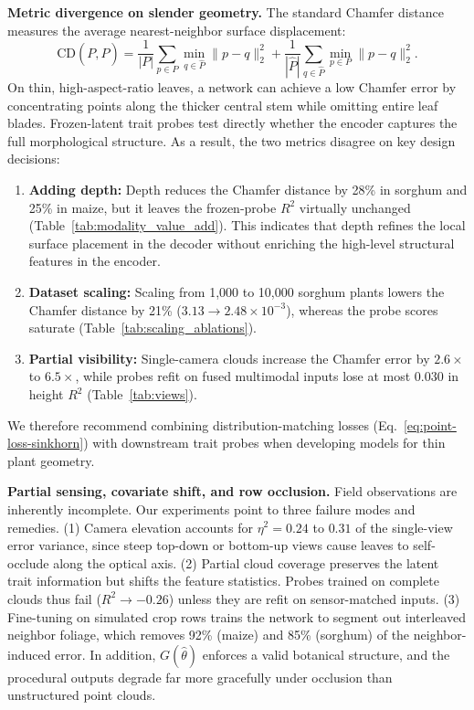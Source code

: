 \documentclass[10pt,twocolumn,letterpaper]{article}
\begin{document}
\noindent\textbf{Metric divergence on slender geometry.}
The standard Chamfer distance measures the average nearest-neighbor surface displacement:
\begin{equation}
  \mathrm{CD}(P, \hat P) = \frac{1}{|P|}\sum_{p\in P}\min_{q\in\hat P}\|p-q\|_2^2 + \frac{1}{|\hat P|}\sum_{q\in\hat P}\min_{p\in P}\|p-q\|_2^2.
  \label{eq:chamfer_def}
\end{equation}
On thin, high-aspect-ratio leaves, a network can achieve a low Chamfer error by concentrating points along the thicker central stem while omitting entire leaf blades. Frozen-latent trait probes test directly whether the encoder captures the full morphological structure. As a result, the two metrics disagree on key design decisions:
\begin{enumerate}
  \item \textbf{Adding depth:} Depth reduces the Chamfer distance by 28\% in sorghum and 25\% in maize, but it leaves the frozen-probe $R^2$ virtually unchanged (Table~\ref{tab:modality_value_add}). This indicates that depth refines the local surface placement in the decoder without enriching the high-level structural features in the encoder.
  \item \textbf{Dataset scaling:} Scaling from 1{,}000 to 10{,}000 sorghum plants lowers the Chamfer distance by 21\% ($3.13 \to 2.48 \times 10^{-3}$), whereas the probe scores saturate (Table~\ref{tab:scaling_ablations}).
  \item \textbf{Partial visibility:} Single-camera clouds increase the Chamfer error by $2.6\times$ to $6.5\times$, while probes refit on fused multimodal inputs lose at most 0.030 in height $R^2$ (Table~\ref{tab:views}).
\end{enumerate}
We therefore recommend combining distribution-matching losses (Eq.~\ref{eq:point-loss-sinkhorn}) with downstream trait probes when developing models for thin plant geometry.

\noindent\textbf{Partial sensing, covariate shift, and row occlusion.}
Field observations are inherently incomplete. Our experiments point to three failure modes and remedies. (1) Camera elevation accounts for $\eta^2 = 0.24$ to $0.31$ of the single-view error variance, since steep top-down or bottom-up views cause leaves to self-occlude along the optical axis. (2) Partial cloud coverage preserves the latent trait information but shifts the feature statistics. Probes trained on complete clouds thus fail ($R^2 \to -0.26$) unless they are refit on sensor-matched inputs. (3) Fine-tuning on simulated crop rows trains the network to segment out interleaved neighbor foliage, which removes 92\% (maize) and 85\% (sorghum) of the neighbor-induced error. In addition, $G(\hat\theta)$ enforces a valid botanical structure, and the procedural outputs degrade far more gracefully under occlusion than unstructured point clouds.
\end{document}
